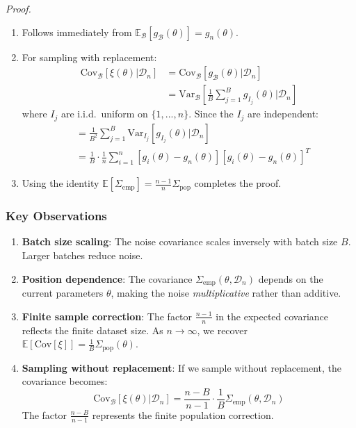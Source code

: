 \documentclass[11pt]{article}
\begin{document}
\textit{Proof.} 
\begin{enumerate}
    \item Follows immediately from $\mathbb{E}_{\mathcal{B}}[g_{\mathcal{B}}(\theta)] = g_n(\theta)$.
    
    \item For sampling with replacement:
    \begin{align}
    \text{Cov}_{\mathcal{B}}[\xi(\theta) | \mathcal{D}_n] &= \text{Cov}_{\mathcal{B}}[g_{\mathcal{B}}(\theta) | \mathcal{D}_n] \\
    &= \text{Var}_{\mathcal{B}}\left[\frac{1}{B} \sum_{j=1}^B g_{I_j}(\theta) \bigg| \mathcal{D}_n\right]
    \end{align}
    where $I_j$ are i.i.d.\ uniform on $\{1, ..., n\}$. Since the $I_j$ are independent:
    \begin{align}
    &= \frac{1}{B^2} \sum_{j=1}^B \text{Var}_{I_j}[g_{I_j}(\theta) | \mathcal{D}_n] \\
    &= \frac{1}{B} \cdot \frac{1}{n} \sum_{i=1}^n [g_i(\theta) - g_n(\theta)][g_i(\theta) - g_n(\theta)]^T
    \end{align}
    
    \item Using the identity $\mathbb{E}[\Sigma_{\text{emp}}] = \frac{n-1}{n} \Sigma_{\text{pop}}$ completes the proof.
\end{enumerate}

\subsubsection{Key Observations}

\begin{enumerate}
    \item \textbf{Batch size scaling}: The noise covariance scales inversely with batch size $B$. Larger batches reduce noise.
    
    \item \textbf{Position dependence}: The covariance $\Sigma_{\text{emp}}(\theta, \mathcal{D}_n)$ depends on the current parameters $\theta$, making the noise \textit{multiplicative} rather than additive.
    
    \item \textbf{Finite sample correction}: The factor $\frac{n-1}{n}$ in the expected covariance reflects the finite dataset size. As $n \to \infty$, we recover $\mathbb{E}[\text{Cov}[\xi]] = \frac{1}{B} \Sigma_{\text{pop}}(\theta)$.
    
    \item \textbf{Sampling without replacement}: If we sample without replacement, the covariance becomes:
    $$\text{Cov}_{\mathcal{B}}[\xi(\theta) | \mathcal{D}_n] = \frac{n-B}{n-1} \cdot \frac{1}{B} \Sigma_{\text{emp}}(\theta, \mathcal{D}_n)$$
    The factor $\frac{n-B}{n-1}$ represents the finite population correction.
\end{enumerate}
\end{document}
